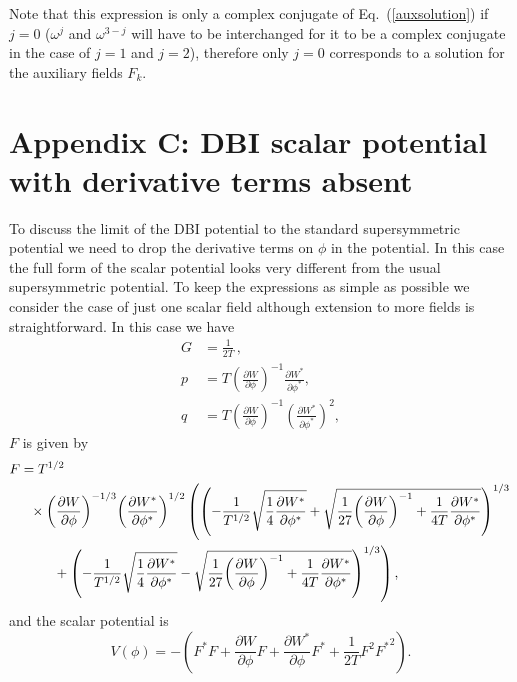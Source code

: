 \documentclass[a4paper,11pt]{article}
\def\non{\nonumber\\}
\def\non{\nonumber\\}
\begin{document}
	Note that this expression is only a complex conjugate of Eq.~(\ref{auxsolution}) if $j=0$ ($\omega^j$ and $\omega^{3-j}$ will have to be interchanged for it to be a complex conjugate in the case of $j = 1$ and $j = 2$), therefore only $j=0$ corresponds to a solution for the auxiliary fields $F_k$.

\section{Appendix C: DBI scalar potential with derivative terms absent \label{appenC}}
	To discuss the limit of the DBI potential to the standard supersymmetric potential we need to drop the derivative terms on $\phi$
	in the potential. In this case the full form of the scalar potential looks very different from the usual supersymmetric potential. To keep the
	expressions as simple as possible we consider the case of just one scalar field although extension to more fields is straightforward.
	In this case we have
	\begin{align}
		G&=\frac{1}{2T}\,,\non
		p&	=T {\left(\frac{\partial W}{\partial \phi}\right)}^{-1}\frac{\partial W^*}{\partial \phi^*},\non
		q&=T {\left(\frac{\partial W}{\partial \phi}\right)}^{-1}{\left(\frac{\partial W^*}{\partial \phi^*}\right)}^2,
	\end{align}
	$F$ is given by
	\begin{equation}\label{DisplayFormulaNumbered:eq.dbiPotentialF}
	\begin{split}
		& F=T^{1/2} \\
		& \indent{}\times{\left(\frac{\partial W}{\partial \phi}\right)}^{-1/3}{\left(\frac{\partial W^*}{\partial \phi^*}\right)}^{1/2}\left({\left(-\frac{1}{T^{1/2}}\sqrt{\frac{1}{4}\frac{\partial W^*}{\partial \phi^*}}+\sqrt{\frac{1}{27}{\left(\frac{\partial W}{\partial \phi}\right)}^{-1}+\frac{1}{4T}\frac{\partial W^*}{\partial \phi^*}}\right)}^{1/3}\right. \\
		& \indent\indent\left.{}+{\left(-\frac{1}{T^{1/2}}\sqrt{\frac{1}{4}\frac{\partial W^*}{\partial \phi^*}}-\sqrt{\frac{1}{27}{\left(\frac{\partial W}{\partial \phi}\right)}^{-1}+\frac{1}{4T}\frac{\partial W^*}{\partial \phi^*}}\right)}^{1/3}\right),
	\end{split}
	\end{equation}
	and the scalar potential is
	\begin{equation}\label{DisplayFormulaNumbered:eq.dbiPotentialWithF}
		V\left(\phi \right)=-\left(F^* F+\frac{\partial W}{\partial \phi}F+\frac{\partial W^*}{\partial \phi}F^*+\frac{1}{2T}F^2{F^*}^2\right).
	\end{equation}
\end{document}
